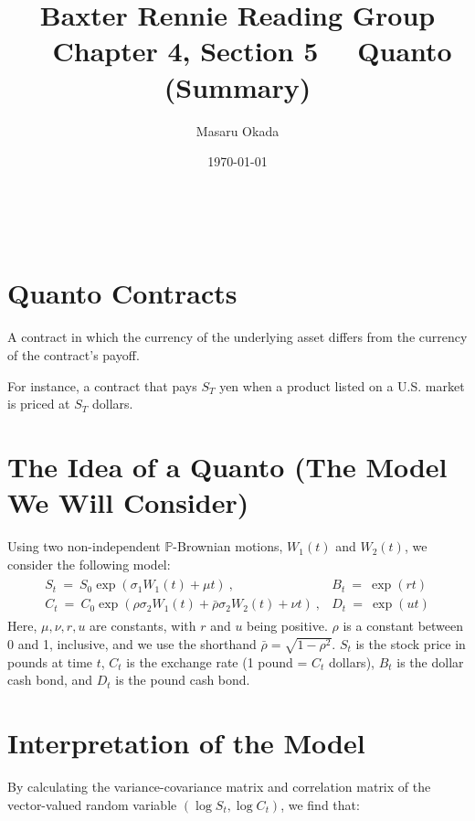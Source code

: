 \documentclass[uplatex,a4j,12pt,dvipdfmx]{jsarticle}
\title{
Baxter Rennie Reading Group \ \ Chapter 4, Section 5 \ \ Quanto (Summary)
}
\author{Masaru Okada}
\date{\today}
\begin{document}
\maketitle

\tableofcontents

\ \\
\section{Quanto Contracts}

A contract in which the currency of the underlying asset differs from the currency of the contract's payoff.

For instance, a contract that pays $S_{T}$ yen when a product listed on a U.S. market is priced at $S_{T}$ dollars.

\section{The Idea of a Quanto (The Model We Will Consider)}

Using two non-independent $\mathbb{P}$-Brownian motions, $W_{1}(t)$ and $W_{2}(t)$, we consider the following model:
%
%
\begin{eqnarray}
	\left.
	\begin{array}{ll}
		S_{t}
		\ = \
		S_{0}
		\exp \left( \sigma_{1} W_{1}(t) + \mu t \right) \ ,
		 &
		B_{t}
		\ = \
		\exp (rt)
		\\
		C_{t}
		\ = \
		C_{0}
		\exp \left(
		\rho \sigma_{2} W_{1}(t) +
		\bar{\rho} \sigma_{2} W_{2}(t) + \nu t \right)\ ,
		 &
		D_{t}
		\ = \
		\exp (ut)
	\end{array}
	\right.
\end{eqnarray}
%
%
Here, $\mu, \nu, r, u$ are constants, with $r$ and $u$ being positive.
$\rho$ is a constant between 0 and 1, inclusive,
and we use the shorthand $\bar{\rho} = \sqrt{1 - \rho^{2}}$.
$S_{t}$ is the stock price in pounds at time $t$,
$C_{t}$ is the exchange rate (1 pound = $C_{t}$ dollars),
$B_{t}$ is the dollar cash bond,
and $D_{t}$ is the pound cash bond.

\section{Interpretation of the Model}

By calculating the variance-covariance matrix and correlation matrix of the vector-valued random variable
$( \log S_{t} , \log C_{t})$,
we find that:
\end{document}
